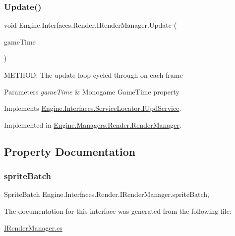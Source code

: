 \subsubsection{\texorpdfstring{Update()}{Update()}}
{\footnotesize\ttfamily void Engine.\+Interfaces.\+Render.\+I\+Render\+Manager.\+Update (\begin{DoxyParamCaption}\item[{Game\+Time}]{game\+Time }\end{DoxyParamCaption})}



M\+E\+T\+H\+OD\+: The update loop cycled through on each frame 


\begin{DoxyParams}{Parameters}
{\em game\+Time} & Monogame Game\+Time property\\
\hline
\end{DoxyParams}


Implements \hyperlink{a00478_a387fce2a5440a4dc63f8d72772ecbdaa}{Engine.\+Interfaces.\+Service\+Locator.\+I\+Upd\+Service}.



Implemented in \hyperlink{a00526_a7b63b947d986ab05b66c4c9f78ee3c20}{Engine.\+Managers.\+Render.\+Render\+Manager}.



\subsection{Property Documentation}
\mbox{\label{a00458_a4733e89074f5ed1383e2328021fb7dd3}} 
\subsubsection{\texorpdfstring{sprite\+Batch}{spriteBatch}}
{\footnotesize\ttfamily Sprite\+Batch Engine.\+Interfaces.\+Render.\+I\+Render\+Manager.\+sprite\+Batch\hspace{0.3cm}{\ttfamily [get]}, {\ttfamily [set]}}



The documentation for this interface was generated from the following file\+:\begin{DoxyCompactItemize}
\item 
\hyperlink{a00125}{I\+Render\+Manager.\+cs}\end{DoxyCompactItemize}
